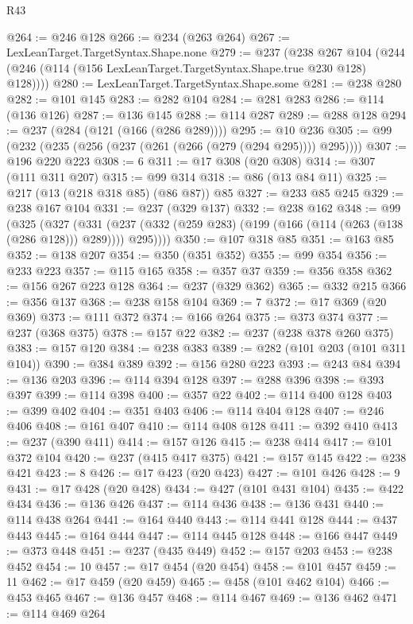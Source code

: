 \begin{lexlean}{R43}
\begin{coremodule}
@264 := @246 @128
@266 := @234 (@263 @264)
@267 := LexLeanTarget.TargetSyntax.Shape.none
@279 := @237
    (@238
      @267
      @104
      (@244 (@246 (@114 (@156 LexLeanTarget.TargetSyntax.Shape.true @230 @128) @128))))
@280 := LexLeanTarget.TargetSyntax.Shape.some
@281 := @238 @280
@282 := @101 @145
@283 := @282 @104
@284 := @281 @283
@286 := @114 (@136 @126)
@287 := @136 @145
@288 := @114 @287
@289 := @288 @128
@294 := @237 (@284 (@121 (@166 (@286 @289))))
@295 := @10 @236
@305 := @99 (@232 (@235 (@256 (@237 (@261 (@266 (@279 (@294 @295)))) @295))))
@307 := @196 @220 @223
@308 := 6
@311 := @17 @308 (@20 @308)
@314 := @307 (@111 @311 @207)
@315 := @99 @314
@318 := @86 (@13 @84 @11)
@325 := @217 (@13 (@218 @318 @85) (@86 @87)) @85
@327 := @233 @85 @245
@329 := @238 @167 @104
@331 := @237 (@329 @137)
@332 := @238 @162
@348 := @99
    (@325
      (@327
        (@331 (@237 (@332 (@259 @283) (@199 (@166 (@114 (@263 (@138 (@286 @128))) @289)))) @295))))
@350 := @107 @318 @85
@351 := @163 @85
@352 := @138 @207
@354 := @350 (@351 @352)
@355 := @99 @354
@356 := @233 @223
@357 := @115 @165
@358 := @357 @37
@359 := @356 @358
@362 := @156 @267 @223 @128
@364 := @237 (@329 @362)
@365 := @332 @215
@366 := @356 @137
@368 := @238 @158 @104
@369 := 7
@372 := @17 @369 (@20 @369)
@373 := @111 @372
@374 := @166 @264
@375 := @373 @374
@377 := @237 (@368 @375)
@378 := @157 @22
@382 := @237 (@238 @378 @260 @375)
@383 := @157 @120
@384 := @238 @383
@389 := @282 (@101 @203 (@101 @311 @104))
@390 := @384 @389
@392 := @156 @280 @223
@393 := @243 @84
@394 := @136 @203
@396 := @114 @394 @128
@397 := @288 @396
@398 := @393 @397
@399 := @114 @398
@400 := @357 @22
@402 := @114 @400 @128
@403 := @399 @402
@404 := @351 @403
@406 := @114 @404 @128
@407 := @246 @406
@408 := @161 @407
@410 := @114 @408 @128
@411 := @392 @410
@413 := @237 (@390 @411)
@414 := @157 @126
@415 := @238 @414
@417 := @101 @372 @104
@420 := @237 (@415 @417 @375)
@421 := @157 @145
@422 := @238 @421
@423 := 8
@426 := @17 @423 (@20 @423)
@427 := @101 @426
@428 := 9
@431 := @17 @428 (@20 @428)
@434 := @427 (@101 @431 @104)
@435 := @422 @434
@436 := @136 @426
@437 := @114 @436
@438 := @136 @431
@440 := @114 @438 @264
@441 := @164 @440
@443 := @114 @441 @128
@444 := @437 @443
@445 := @164 @444
@447 := @114 @445 @128
@448 := @166 @447
@449 := @373 @448
@451 := @237 (@435 @449)
@452 := @157 @203
@453 := @238 @452
@454 := 10
@457 := @17 @454 (@20 @454)
@458 := @101 @457
@459 := 11
@462 := @17 @459 (@20 @459)
@465 := @458 (@101 @462 @104)
@466 := @453 @465
@467 := @136 @457
@468 := @114 @467
@469 := @136 @462
@471 := @114 @469 @264

\end{coremodule}
\end{lexlean}
